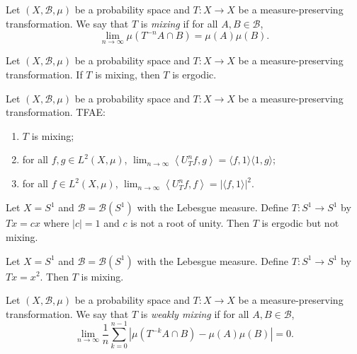     \begin{definition}\label{def:mixing_measure_transformation}
        Let \((X, \mathcal{B}, \mu)\) be a probability space and \(T:X\to X\) be a measure-preserving transformation.
        We say that \(T\) is \emph{mixing} if for all \(A, B \in \mathcal{B}\),
        \[
            \lim_{n\to \infty} \mu(T^{-n}A \cap B) = \mu(A) \mu(B).
        \]
    \end{definition}

    \begin{lemma}\label{lem:mixing_implies_ergodic}
        Let \((X, \mathcal{B}, \mu)\) be a probability space and \(T:X\to X\) be a measure-preserving transformation.
        If \(T\) is mixing, then \(T\) is ergodic.
    \end{lemma}

    \begin{theorem}\label{thm:characterization_of_mixing_mp}
        Let \((X, \mathcal{B}, \mu)\) be a probability space and \(T:X\to X\) be a measure-preserving transformation.
        TFAE:
        \begin{enumerate}
            \item \(T\) is mixing;
            \item for all \(f, g \in L^2(X, \mu)\), \(\lim_{n\to \infty} \left< U_T^n f, g \right> = \langle f, 1 \rangle \langle 1, g \rangle\);
            \item for all \(f \in L^2(X, \mu)\), \(\lim_{n\to \infty} \left< U_T^n f, f \right> = |\langle f, 1 \rangle|^2\).
        \end{enumerate}
    \end{theorem}

    \begin{example}\label{eg:irrational_rotation_is_ergodic_but_not_mixing}
        Let \(X = S^1\) and \(\mathcal{B} = \mathcal{B}(S^1)\) with the Lebesgue measure.
        Define \(T:S^1 \to S^1\) by \(Tx = cx\) where \(|c| = 1\) and \(c\) is not a root of unity.
        Then \(T\) is ergodic but not mixing.
    \end{example}

    \begin{example}\label{eg:power_map_on_S1_is_mixing}
        Let \(X = S^1\) and \(\mathcal{B} = \mathcal{B}(S^1)\) with the Lebesgue measure.
        Define \(T:S^1 \to S^1\) by \(Tx = x^2\).
        Then \(T\) is mixing.
    \end{example}

    \begin{definition}\label{def:weakly_mixing_measure_transformation}
        Let \((X, \mathcal{B}, \mu)\) be a probability space and \(T:X\to X\) be a measure-preserving transformation.
        We say that \(T\) is \emph{weakly mixing} if for all \(A, B \in \mathcal{B}\),
        \[
            \lim_{n\to \infty} \frac{1}{n} \sum_{k=0}^{n-1} \left| \mu(T^{-k}A \cap B) - \mu(A) \mu(B) \right| = 0.
        \]
    \end{definition}

